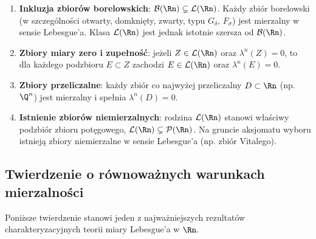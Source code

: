 \begin{tw}
    \leavevmode
    \begin{enumerate}

        \item \textbf{Inkluzja zbiorów borelowskich}: $\mathcal{B}(\Rn) \subsetneq \mathcal{L}(\Rn)$. Każdy zbiór borelowski (w szczególności otwarty, domknięty, zwarty, typu $G_\delta$, $F_\sigma$) jest mierzalny w sensie Lebesgue'a. Klasa $\mathcal{L}(\Rn)$ jest jednak istotnie szersza od $\mathcal{B}(\Rn)$.

        \item \textbf{Zbiory miary zero i zupełność}: jeżeli $Z \in \mathcal{L}(\Rn)$ oraz $\lambda^n(Z) = 0$, to dla każdego podzbioru $E \subset Z$ zachodzi $E \in \mathcal{L}(\Rn)$ oraz $\lambda^n(E) = 0$.

        \item \textbf{Zbiory przeliczalne}: każdy zbiór co najwyżej przeliczalny $D \subset \Rn$ (np. $\Q^n$) jest mierzalny i spełnia $\lambda^n(D) = 0$.

        \item \textbf{Istnienie zbiorów niemierzalnych}: rodzina $\mathcal{L}(\Rn)$ stanowi właściwy podzbiór zbioru potęgowego, $\mathcal{L}(\Rn) \subsetneq \mathcal{P}(\Rn)$. Na gruncie aksjomatu wyboru istnieją zbiory niemierzalne w sensie Lebesgue'a (np. zbiór Vitalego).

    \end{enumerate}
\end{tw}

\subsection{Twierdzenie o równoważnych warunkach mierzalności}

Poniższe twierdzenie stanowi jeden z najważniejszych rezultatów charakteryzacyjnych teorii miary Lebesgue'a w $\Rn$.

